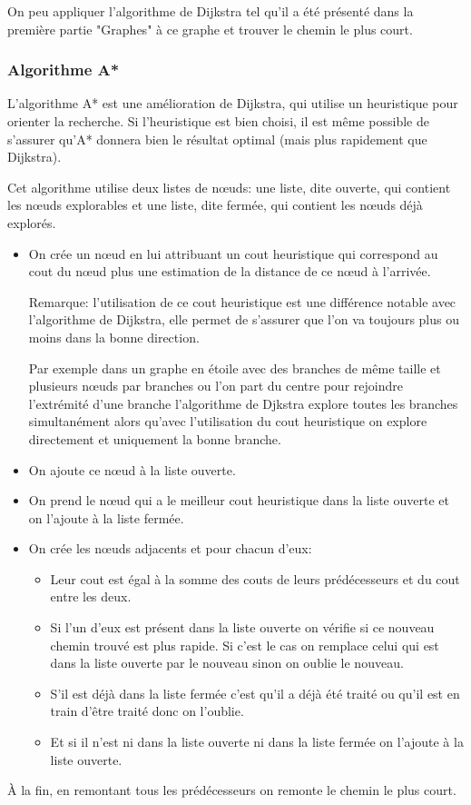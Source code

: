     On peu appliquer l'algorithme de Dijkstra tel qu'il a été présenté dans la
    première partie "Graphes" à ce graphe et trouver le chemin le plus court.

  \subsubsection{Algorithme A*}
    L'algorithme A* est une amélioration de Dijkstra, qui utilise un heuristique
    pour orienter la recherche.
    Si l'heuristique est bien choisi, il est même possible de s'assurer qu'A*
    donnera bien le résultat optimal (mais plus rapidement que Dijkstra).

    Cet algorithme utilise deux listes de nœuds: une liste, dite ouverte, qui
    contient les nœuds explorables et une liste, dite fermée, qui contient les
    nœuds déjà explorés.

    \begin{itemize}
      \item On crée un nœud en lui attribuant un cout heuristique qui
        correspond au cout du nœud plus une estimation de la distance de ce
        nœud à l'arrivée.

        Remarque: l'utilisation de ce cout heuristique est une différence
        notable avec l'algorithme de Dijkstra, elle permet de s'assurer que
        l'on va toujours plus ou moins dans la bonne direction.

        Par exemple dans un graphe en étoile avec des branches de même taille
        et plusieurs nœuds par branches ou l'on part du centre pour rejoindre
        l'extrémité d'une branche l'algorithme de Djkstra explore toutes les
        branches simultanément alors qu'avec l'utilisation du cout heuristique
        on explore directement et uniquement la bonne branche.
      \item On ajoute ce nœud à la liste ouverte.
      \item On prend le nœud qui a le meilleur cout heuristique dans la liste
        ouverte et on l'ajoute à la liste fermée.
      \item On crée les nœuds adjacents et pour chacun d'eux:
        \begin{itemize}
          \item Leur cout est égal à la somme des couts de leurs prédécesseurs
            et du cout entre les deux.
          \item Si l'un d'eux est présent dans la liste ouverte on vérifie si
            ce nouveau chemin trouvé est plus rapide. Si c'est le cas on
            remplace celui qui est dans la liste ouverte par le nouveau sinon
            on oublie le nouveau.
          \item S'il est déjà dans la liste fermée c'est qu'il a déjà été
            traité ou qu'il est en train d'être traité donc on l'oublie.
          \item Et si il n'est ni dans la liste ouverte ni dans la liste fermée
            on l'ajoute à la liste ouverte.
        \end{itemize}
    \end{itemize}
	
    À la fin, en remontant tous les prédécesseurs on remonte le chemin le plus
    court.

